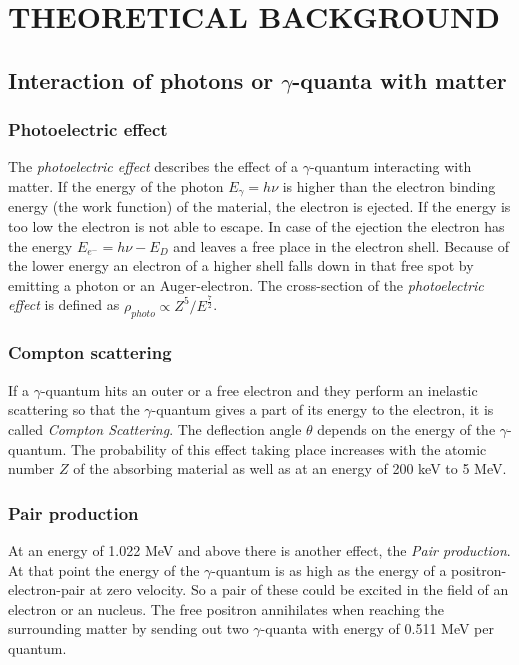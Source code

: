 \chapter{THEORETICAL BACKGROUND}
\section{Interaction of photons or $\gamma$-quanta with matter}
\subsection*{Photoelectric effect}
The \textit{photoelectric effect} describes the effect of a $\gamma$-quantum interacting with matter. If the energy of the photon $\mathit{E_{\gamma}=h\nu}$ is higher than the electron binding energy (the work function) of the material, the electron is ejected. If the energy is too low the electron is not able to escape. In case of the ejection the electron has the energy $\mathit{E_{e^{-}}=h\nu-E_{D}}$ and leaves a free place in the electron shell. Because of the lower energy an electron of a higher shell falls down in that free spot by emitting a photon or an Auger-electron. The cross-section of the \textit{photoelectric effect} is defined as $\mathit{\rho_{photo}\propto Z^{5}/E^{\frac{7}{2}}}$.

\subsection*{Compton scattering}
If a $\gamma$-quantum hits an outer or a free electron and they perform an inelastic scattering so that the $\gamma$-quantum gives a part of its energy to the electron, it is called \textit{Compton Scattering}. The deflection angle $\theta$ depends on the energy of the $\gamma$-quantum. The probability of this effect taking place increases with the atomic number $\mathit{Z}$ of the absorbing material as well as at an energy of 200 keV to 5 MeV.

\subsection*{Pair production}
At an energy of 1.022 MeV and above there is another effect, the \textit{Pair production}. At that point the energy of the $\gamma$-quantum is as high as the energy of a positron-electron-pair at zero velocity. So a pair of these could be excited in the field of an electron or an nucleus. The free positron annihilates when reaching the surrounding matter by sending out two $\gamma$-quanta with energy of 0.511 MeV per quantum.

